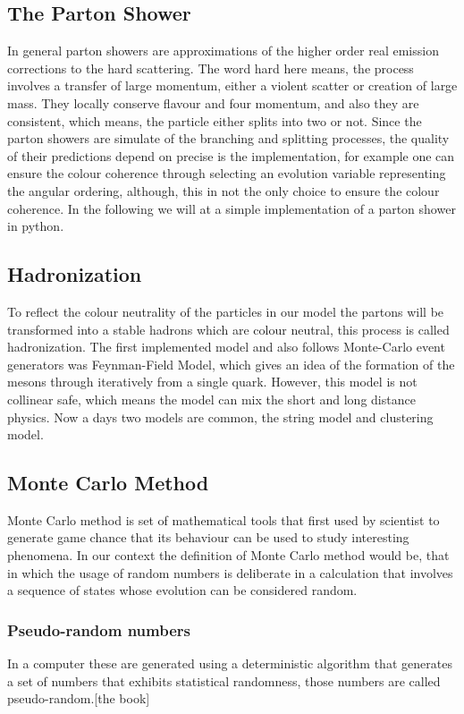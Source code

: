 \documentclass[12pt,a4paper]{article}
\begin{document}
\subsection{The Parton Shower}
In general parton showers are approximations of the higher order real emission corrections to the hard scattering. The word hard here means, the process involves a transfer of large momentum, either a violent scatter or creation of large mass. They locally conserve flavour and four momentum, and also they are consistent, which means, the particle either splits into two or not. 
Since the parton showers are simulate of the branching and splitting processes, the quality of their predictions depend on precise is the implementation, for example one can ensure the colour coherence through selecting an evolution variable representing the angular ordering, although, this in not the only choice to ensure the colour coherence. In the following we will at a simple implementation of a parton shower in python.   
\subsection{Hadronization}  

To reflect the colour neutrality of the particles in our model the partons will be transformed into a stable hadrons which are colour neutral, this process is called hadronization. The first implemented model and also follows Monte-Carlo event generators was Feynman-Field Model, which gives an idea of the formation of the mesons through iteratively from a single quark. However, this model is not collinear safe, which means the model can mix the short and long distance physics. Now a days two models are common, the string model and clustering model. 
     
      
\subsection{Monte Carlo Method}
Monte Carlo method is set of mathematical tools that first used by scientist to generate game chance that its behaviour can be used to study interesting phenomena. In our context the definition of Monte Carlo method would be, that in which the usage of random numbers is deliberate in a calculation that involves a sequence of states whose  evolution can be considered random. 
\subsubsection{Pseudo-random numbers}
In a computer these are generated using a deterministic algorithm that generates a set of numbers that exhibits statistical randomness, those numbers are called pseudo-random.[the book] 
\end{document}

